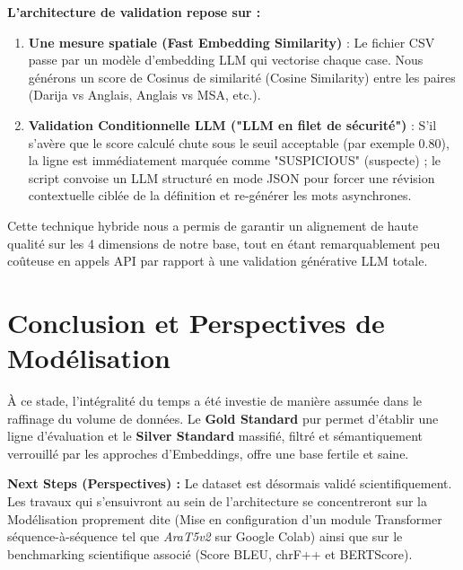 \documentclass[12pt,a4paper]{article}
\begin{document}
\textbf{L'architecture de validation repose sur :}
\begin{enumerate}
    \item \textbf{Une mesure spatiale (Fast Embedding Similarity)} : Le fichier CSV passe par un modèle d'embedding LLM qui vectorise chaque case. Nous générons un score de Cosinus de similarité (Cosine Similarity) entre les paires (Darija vs Anglais, Anglais vs MSA, etc.).
    \item \textbf{Validation Conditionnelle LLM ("LLM en filet de sécurité")} : S'il s'avère que le score calculé chute sous le seuil acceptable (par exemple 0.80), la ligne est immédiatement marquée comme "SUSPICIOUS" (suspecte) ; le script convoise un LLM structuré en mode JSON pour forcer une révision contextuelle ciblée de la définition et re-générer les mots asynchrones. 
\end{enumerate}
Cette technique hybride nous a permis de garantir un alignement de haute qualité sur les 4 dimensions de notre base, tout en étant remarquablement peu coûteuse en appels API par rapport à une validation générative LLM totale.

\section{Conclusion et Perspectives de Modélisation}
À ce stade, l'intégralité du temps a été investie de manière assumée dans le raffinage du volume de données. Le \textbf{Gold Standard} pur permet d'établir une ligne d'évaluation et le \textbf{Silver Standard} massifié, filtré et sémantiquement verrouillé par les approches d'Embeddings, offre une base fertile et saine.

\textbf{Next Steps (Perspectives) :}
Le dataset est désormais validé scientifiquement. Les travaux qui s'ensuivront au sein de l'architecture se concentreront sur la Modélisation proprement dite (Mise en configuration d'un module Transformer séquence-à-séquence tel que \textit{AraT5v2} sur Google Colab) ainsi que sur le benchmarking scientifique associé (Score BLEU, chrF++ et BERTScore).
\end{document}
